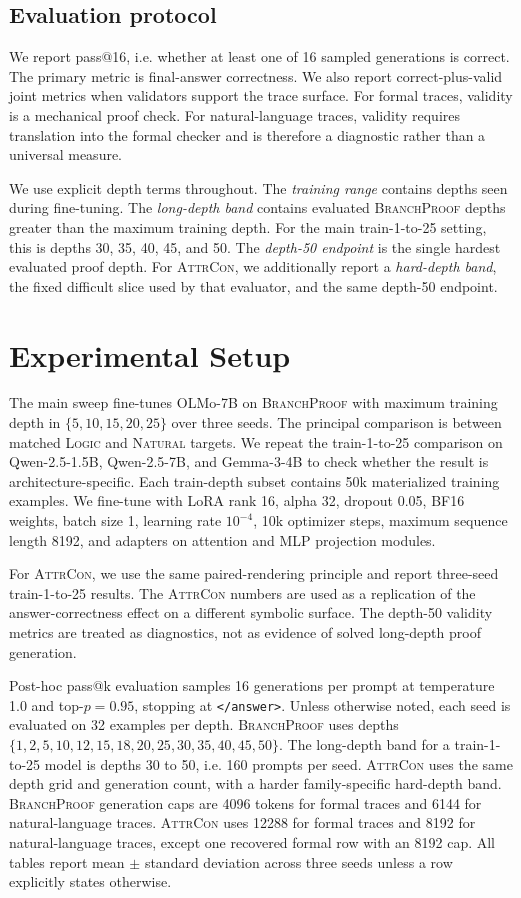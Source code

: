 \documentclass[11pt]{article}
\makeatletter
\newcommand{\branchproof}{\textsc{BranchProof}}
\newcommand{\attrcon}{\textsc{AttrCon}}
\newcommand{\logic}{\textsc{Logic}}
\newcommand{\nl}{\textsc{Natural}}
\newcommand{\passsixteen}{pass@16}
\makeatother
\begin{document}
\subsection{Evaluation protocol}

We report \passsixteen{}, i.e. whether at least one of 16 sampled generations is
correct. The primary metric is final-answer correctness. We also report
correct-plus-valid joint metrics when validators support the trace surface. For
formal traces, validity is a mechanical proof check. For natural-language
traces, validity requires translation into the formal checker and is therefore a
diagnostic rather than a universal measure.

We use explicit depth terms throughout. The \emph{training range} contains
depths seen during fine-tuning. The
\emph{long-depth band} contains evaluated \branchproof{} depths greater than the
maximum training depth. For the main train-1-to-25 setting, this is depths
30, 35, 40, 45, and 50. The \emph{depth-50 endpoint} is the single hardest
evaluated proof depth. For \attrcon{}, we additionally report a
\emph{hard-depth band}, the fixed difficult slice used by that evaluator, and
the same depth-50 endpoint.

\section{Experimental Setup}
\label{sec:setup}

The main sweep fine-tunes OLMo-7B on \branchproof{} with maximum training depth
in $\{5,10,15,20,25\}$ over three seeds. The principal comparison is between
matched \logic{} and \nl{} targets. We repeat the train-1-to-25 comparison on
Qwen-2.5-1.5B, Qwen-2.5-7B, and Gemma-3-4B to check whether the result is
architecture-specific. Each train-depth subset contains 50k materialized
training examples. We fine-tune with LoRA rank 16, alpha 32, dropout 0.05, BF16
weights, batch size 1, learning rate $10^{-4}$, 10k optimizer steps, maximum
sequence length 8192, and adapters on attention and MLP projection modules.

For \attrcon{}, we use the same paired-rendering principle and report
three-seed train-1-to-25 results. The \attrcon{} numbers are used as a
replication of the answer-correctness effect on a different symbolic surface.
The depth-50 validity metrics are treated as diagnostics, not as evidence of
solved long-depth proof generation.

Post-hoc pass@k evaluation samples 16 generations per prompt at temperature
1.0 and top-$p=0.95$, stopping at \texttt{</answer>}. Unless otherwise noted,
each seed is evaluated on 32 examples per depth. \branchproof{} uses depths
$\{1,2,5,10,12,15,18,20,25,30,35,40,45,50\}$. The long-depth band for a
train-1-to-25 model is depths 30 to 50, i.e. 160 prompts per seed. \attrcon{} uses
the same depth grid and generation count, with a harder family-specific
hard-depth band. \branchproof{} generation caps are 4096 tokens for formal
traces and 6144 for natural-language traces. \attrcon{} uses 12288 for formal
traces and 8192 for natural-language traces, except one recovered formal row
with an 8192 cap. All tables report mean $\pm$ standard deviation across three
seeds unless a row explicitly states otherwise.
\end{document}
